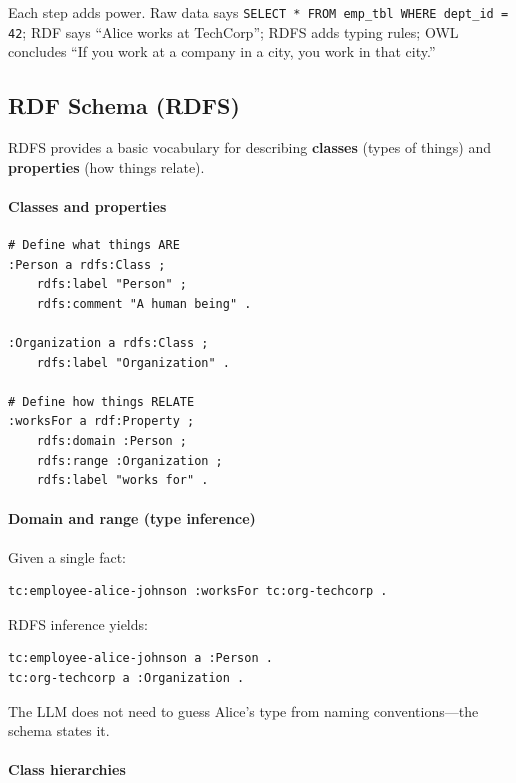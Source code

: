 Each step adds power. Raw data says \texttt{SELECT * FROM emp\_tbl WHERE dept\_id = 42};
RDF says ``Alice works at TechCorp''; RDFS adds typing rules; OWL concludes
``If you work at a company in a city, you work in that city.''

\subsection{RDF Schema (RDFS)}

RDFS provides a basic vocabulary for describing \textbf{classes} (types of things)
and \textbf{properties} (how things relate).

\paragraph{Classes and properties}

\begin{verbatim}
# Define what things ARE
:Person a rdfs:Class ;
    rdfs:label "Person" ;
    rdfs:comment "A human being" .

:Organization a rdfs:Class ;
    rdfs:label "Organization" .

# Define how things RELATE
:worksFor a rdf:Property ;
    rdfs:domain :Person ;
    rdfs:range :Organization ;
    rdfs:label "works for" .
\end{verbatim}

\paragraph{Domain and range (type inference)}

Given a single fact:

\begin{verbatim}
tc:employee-alice-johnson :worksFor tc:org-techcorp .
\end{verbatim}

RDFS inference yields:

\begin{verbatim}
tc:employee-alice-johnson a :Person .
tc:org-techcorp a :Organization .
\end{verbatim}

The LLM does not need to guess Alice's type from naming conventions---the schema
states it.

\paragraph{Class hierarchies}

